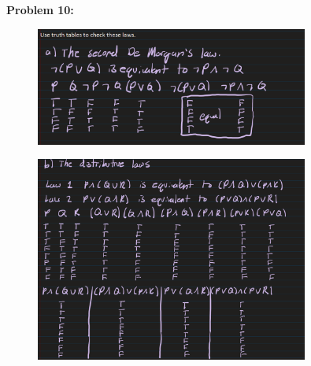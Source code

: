 \textbf{Problem 10:}
\begin{figure}[H]
    \centering
    \includegraphics[width=0.8\textwidth]{images/1.2/4.PNG}
\end{figure}
\begin{figure}[H]
    \centering
    \includegraphics[width=0.8\textwidth]{images/1.2/5.PNG}
\end{figure}


